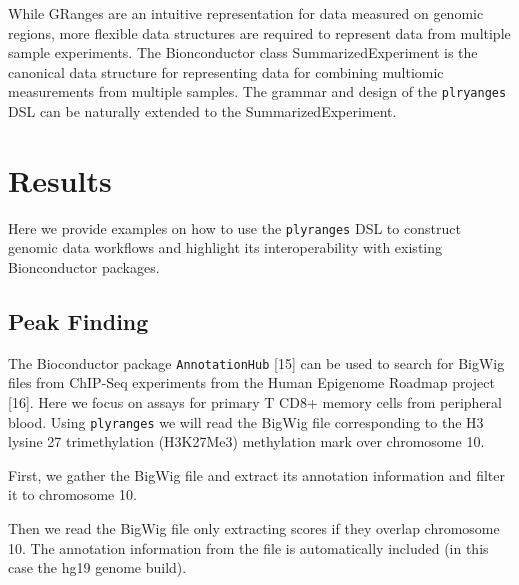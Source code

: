 \documentclass[10pt,letterpaper]{article}
\newenvironment{Shaded}{\begin{snugshade}}{\end{snugshade}}
\newcommand{\KeywordTok}[1]{\textcolor[rgb]{0.13,0.29,0.53}{\textbf{#1}}}
\newcommand{\DataTypeTok}[1]{\textcolor[rgb]{0.13,0.29,0.53}{#1}}
\newcommand{\StringTok}[1]{\textcolor[rgb]{0.31,0.60,0.02}{#1}}
\newcommand{\OperatorTok}[1]{\textcolor[rgb]{0.81,0.36,0.00}{\textbf{#1}}}
\newcommand{\NormalTok}[1]{#1}
\begin{document}
While GRanges are an intuitive representation for data measured on
genomic regions, more flexible data structures are required to represent
data from multiple sample experiments. The Bionconductor class
SummarizedExperiment is the canonical data structure for representing
data for combining multiomic measurements from multiple samples. The
grammar and design of the \texttt{plryanges} DSL can be naturally
extended to the SummarizedExperiment.

\section{Results}\label{results}

Here we provide examples on how to use the \texttt{plyranges} DSL to
construct genomic data workflows and highlight its interoperability with
existing Bionconductor packages.

\subsection{Peak Finding}\label{peak-finding}

The Bioconductor package \texttt{AnnotationHub} {[}15{]} can be used to
search for BigWig files from ChIP-Seq experiments from the Human
Epigenome Roadmap project {[}16{]}. Here we focus on assays for primary
T CD8+ memory cells from peripheral blood. Using \texttt{plyranges} we
will read the BigWig file corresponding to the H3 lysine 27
trimethylation (H3K27Me3) methylation mark over chromosome 10.

First, we gather the BigWig file and extract its annotation information
and filter it to chromosome 10.

\begin{Shaded}
\end{Shaded}

Then we read the BigWig file only extracting scores if they overlap
chromosome 10. The annotation information from the file is automatically
included (in this case the hg19 genome build).

\begin{Shaded}
\end{Shaded}
\end{document}
